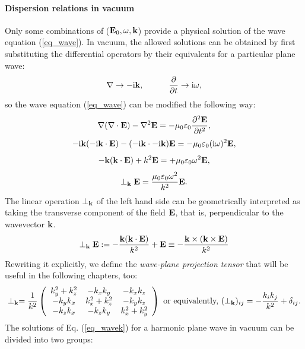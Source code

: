 \paragraph{Dispersion relations in vacuum} %
Only some combinations of ($\mathbf{E}_0, \omega, {\mathbf{k}}$) provide a physical solution of the wave equation (\ref{eq_wave}). In vacuum, the allowed solutions can be obtained by first substituting the differential operators by their equivalents for a particular plane wave:
\begin{equation} \nabla \rightarrow -{\mathrm i}{\mathbf{k}}, \quad\quad\quad 
\frac{\partial} {\partial t} \rightarrow {\mathrm i}\omega, \label{eq_difftok}\end{equation}
so the wave equation (\ref{eq_wave}) can be modified the following way:
$$					\nabla (\nabla \cdot \mathbf{E}) - \nabla^2 \mathbf{E}				  =	-\mu_0 \varepsilon_0 \frac{\partial^{2} \mathbf{E}}{\partial t^{2}},  $$
$$				 -{\mathrm i}{\mathbf{k}} (-{\mathrm i}{\mathbf{k}} \cdot \mathbf{E})  - (-{\mathrm i}{\mathbf{k}} \cdot -{\mathrm i}{\mathbf{k}}) \mathbf{E} = -\mu_0 \varepsilon_0 ({\mathrm i}\omega)^2 \mathbf{E}, $$
$$   - {\mathbf{k}} ({\mathbf{k}} \cdot \mathbf{E})      +          k^2 \mathbf{E}            = +\mu_0 \varepsilon_0 \omega^{2} \mathbf{E},  $$
\begin{equation}  \perp_{\mathbf{k}}\mathbf{E}            = \frac{\mu_0 \varepsilon_0 \omega^{2}}{k^2} \mathbf{E}.  \label{eq_wavek}\end{equation}
The linear operation $\perp_{\mathbf{k}}$ of the left hand side can be geometrically interpreted as taking the transverse component of the field $\mathbf{E}$, that is, perpendicular to the wavevector ${\mathbf{k}}$. 
\begin{equation} \perp_{\mathbf{k}}\mathbf{E} :=  -\frac{{\mathbf{k}} ({\mathbf{k}} \cdot \mathbf{E})}{k^2} + \mathbf{E}     \equiv     - \frac{{\mathbf{k}}\times({\mathbf{k}}\times\mathbf{E})}{k^2} \label{eq_transverse1}\end{equation}
Rewriting it explicitly, we define the \textit{wave-plane projection tensor} that will be useful in the following chapters, too:
\begin{equation} \perp_{\mathbf{k}} = \frac{1}{k^2} 
\left(\begin{array}{ccc} 
	k_y^2+k_z^2  	& -k_x k_y 		& -k_x k_z \\ 
	-k_y k_x 		& k_x^2+k_z^2	& -k_y k_z \\ 
	-k_z k_x 		& -k_z k_y		& k_x^2+k_y^2
	\end{array} \right) 
\text{ or equivalently, }
(\perp_{\mathbf{k}})_{ij} = - \frac{k_i k_j}{k^2} + \delta_{ij} .  \label{eq_transverse2}\end{equation}
The solutions of Eq. (\ref{eq_wavek}) for a harmonic plane wave in vacuum can be divided into two groups: %

